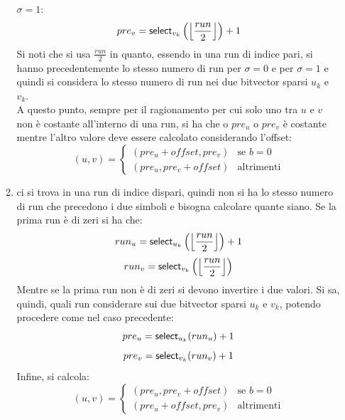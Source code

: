 \begin{enumerate}
\begin{enumerate}
    $\sigma=1$: 
    \begin{equation}
      \label{eq:bv14}
      pre_v=\mbox{\rm {\sf select}}_{v_k}\left(\left\lfloor\frac{run}{2}\right\rfloor\right)+1
    \end{equation}
    Si noti che si usa $\frac{run}{2}$ in quanto, essendo in una run di indice
    pari, si hanno precedentemente lo stesso numero di run per $\sigma=0$ e per
    $\sigma=1$ e quindi si considera lo stesso numero di run nei due
    bitvector sparsi $u_k$ e $v_k$.\\
    A questo punto, sempre per il ragionamento per cui solo uno tra $u$ e $v$
    non è costante all'interno di una run, si ha che o $pre_u$ o $pre_v$ è
    costante mentre l'altro valore deve essere calcolato considerando l'offset:
    \begin{equation}
      \label{eq:bv15}
      (u,v)=
      \begin{cases}
        (pre_u+offset,pre_v)&\mbox{se } b=0\\
        (pre_u,pre_v+offset)&\mbox{altrimenti}
      \end{cases}
    \end{equation}
    \item ci si trova in una run di indice dispari, quindi non si ha 
    lo stesso numero di run che precedono i due simboli e bisogna
    calcolare quante siano. Se la prima run è di zeri si ha che:
    \begin{equation}
      \label{eq:bv16}
      run_u=\mbox{\rm {\sf select}}_{u_k}\left(\left\lfloor\frac{run}{2}\right\rfloor\right)+1
    \end{equation}
    \begin{equation}
      \label{eq:bv17}
      run_v=\mbox{\rm {\sf select}}_{v_k}\left(\left\lfloor\frac{run}{2}\right\rfloor\right)
    \end{equation}
    Mentre se la prima run non è di zeri si devono invertire i due valori. Si
    sa, 
    quindi, quali run considerare sui due bitvector sparsi $u_k$ e
    $v_k$, potendo procedere come nel caso precedente:
    \begin{equation}
      \label{eq:bv18}
      pre_u=\mbox{\rm {\sf select}}_{u_k}(run_u)+1
    \end{equation}
    \begin{equation}
      \label{eq:bv19}
      pre_v=\mbox{\rm {\sf select}}_{v_k}(run_v)+1
    \end{equation}
    Infine, si calcola:
    \begin{equation}
      \label{eq:bv20}
      (u,v)=
      \begin{cases}
        (pre_u,pre_v+offset)&\mbox{se } b=0\\
        (pre_u+offset,pre_v)&\mbox{altrimenti}
      \end{cases}
    \end{equation}
  \end{enumerate}
\end{enumerate}
